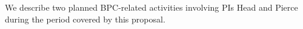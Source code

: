 We describe two planned BPC-related activities involving
PIs Head and Pierce during the period covered by this proposal.






